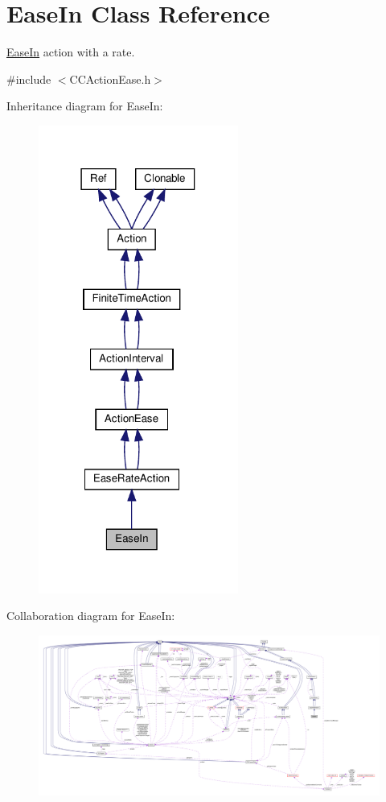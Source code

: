 \hypertarget{classEaseIn}{}\section{Ease\+In Class Reference}
\label{classEaseIn}


\hyperlink{classEaseIn}{Ease\+In} action with a rate.  




{\ttfamily \#include $<$C\+C\+Action\+Ease.\+h$>$}



Inheritance diagram for Ease\+In\+:
\nopagebreak
\begin{figure}[H]
\begin{center}
\leavevmode
\includegraphics[width=186pt]{classEaseIn__inherit__graph}
\end{center}
\end{figure}


Collaboration diagram for Ease\+In\+:
\nopagebreak
\begin{figure}[H]
\begin{center}
\leavevmode
\includegraphics[width=350pt]{classEaseIn__coll__graph}
\end{center}
\end{figure}
